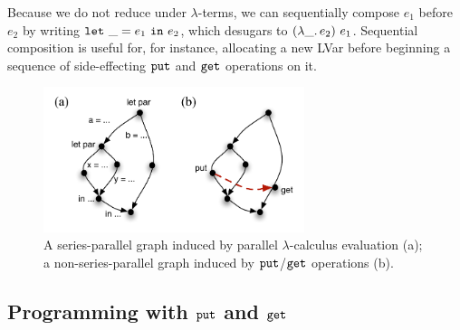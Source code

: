 Because we do not reduce under $\lambda$-terms,
we can sequentially compose $e_1$ before $e_2$ by writing $\mbox{\texttt{let}}~\_=e_1~\mbox{\texttt{in}}~e_2$,
which desugars to $(\lambda\_.\,e_2)~e_1$.
Sequential composition is useful for, for instance, allocating a new LVar before
beginning a sequence of  side-effecting $\mbox{\texttt{put}}$
and $\mbox{\texttt{get}}$ operations on it.

\begin{figure}[tb]
  \centering 
\includegraphics[width=3in]{chapter2/figures/SeriesParallel.pdf} 
\caption{\footnotesize A series-parallel graph induced by parallel
    $\lambda$-calculus evaluation (a); a non-series-parallel
    graph induced by $\mbox{\texttt{put}}$/$\mbox{\texttt{get}}$ operations (b).}
  \label{f:series-parallel}
\end{figure}



\subsection{Programming with $\mbox{\texttt{put}}$ and $\mbox{\texttt{get}}$}\label{subsection:programming-with-put-and-get}


